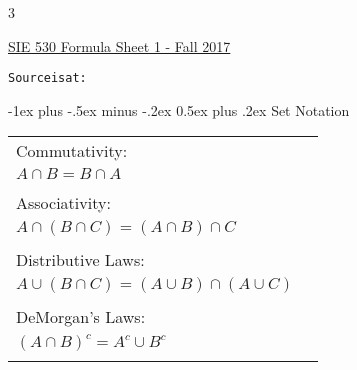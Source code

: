 \documentclass[8pt,landscape]{extarticle}
\makeatletter
\newcommand\NumCols{3}
\renewcommand{\section}{\@startsection{section}{1}{0mm}%
                                {-1ex plus -.5ex minus -.2ex}%
                                {0.5ex plus .2ex}%
                                {\normalfont\large\bfseries}}
\makeatother
\begin{document}
\raggedright
\begin{multicols}{\NumCols}


\setlength{\premulticols}{1pt}
\setlength{\postmulticols}{1pt}
\setlength{\multicolsep}{1pt}
\setlength{\columnsep}{2pt}

\begin{center}
     \Large{\underline{SIE 530 Formula Sheet 1 - Fall 2017}} \\
     
\end{center}


\begin{alltt}
Source is at: 
\end{alltt}

\section{Set Notation}
\hspace*{-0.2cm}\begin{tabularx}{\textwidth/\NumCols}{ l X }
Commutativity: &
\hspace*{-0.5cm}\begin{tabular}{ l }
$A \cup B = B \cup A$ \\
$ A \cap B = B \cap A$ \\
\end{tabular}\hspace*{-1cm} \\

Associativity: &
\hspace*{-0.5cm}\begin{tabular}{ l }
$A\cup (B \cup C)=(A \cup B) \cup C$ \\
$A \cap (B \cap C) = (A \cap B) \cap C$ \\
\end{tabular} \\

Distributive Laws: &
\hspace*{-0.5cm}\begin{tabular}{ l }
$A \cap(B \cup C) = (A \cap B) \cup ( A \cap C)$ \\
$ A \cup (B \cap C) = (A \cup B) \cap (A \cup C)$ \\
\end{tabular}\\

DeMorgan's Laws: &
\hspace*{-0.5cm}\begin{tabular}{ l }
$(A \cup B)^c=A^c \cap B^c$ \\
$(A \cap B)^c=A^c\cup B^c$ \\
\end{tabular} \\
\end{tabularx}


\end{multicols}
\end{document}
